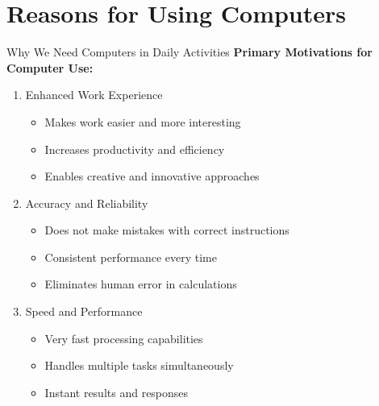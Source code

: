 \documentclass[aspectratio=169]{beamer}
\begin{document}
\section{Reasons for Using Computers}

\begin{frame}{Why We Need Computers in Daily Activities}
    \textbf{Primary Motivations for Computer Use:}
    
    \begin{enumerate}
        \item Enhanced Work Experience
        \begin{itemize}
            \item Makes work easier and more interesting
            \item Increases productivity and efficiency
            \item Enables creative and innovative approaches
        \end{itemize}
        
        \item Accuracy and Reliability
        \begin{itemize}
            \item Does not make mistakes with correct instructions
            \item Consistent performance every time
            \item Eliminates human error in calculations
        \end{itemize}
        
        \item Speed and Performance
        \begin{itemize}
            \item Very fast processing capabilities
            \item Handles multiple tasks simultaneously
            \item Instant results and responses
        \end{itemize}
    \end{enumerate}
\end{frame}
\end{document}
